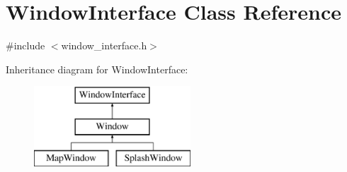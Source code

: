 \hypertarget{classWindowInterface}{\section{Window\-Interface Class Reference}
\label{classWindowInterface}
}


{\ttfamily \#include $<$window\-\_\-interface.\-h$>$}

Inheritance diagram for Window\-Interface\-:\begin{figure}[H]
\begin{center}
\leavevmode
\includegraphics[height=3.000000cm]{classWindowInterface}
\end{center}
\end{figure}
